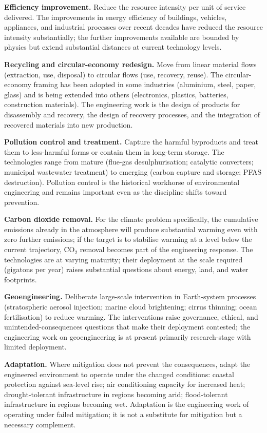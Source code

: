 \textbf{Efficiency improvement.} Reduce the resource intensity per unit of service delivered. The improvements in energy efficiency of buildings, vehicles, appliances, and industrial processes over recent decades have reduced the resource intensity substantially; the further improvements available are bounded by physics but extend substantial distances at current technology levels.

\textbf{Recycling and circular-economy redesign.} Move from linear material flows (extraction, use, disposal) to circular flows (use, recovery, reuse). The circular-economy framing has been adopted in some industries (aluminium, steel, paper, glass) and is being extended into others (electronics, plastics, batteries, construction materials). The engineering work is the design of products for disassembly and recovery, the design of recovery processes, and the integration of recovered materials into new production.

\textbf{Pollution control and treatment.} Capture the harmful byproducts and treat them to less-harmful forms or contain them in long-term storage. The technologies range from mature (flue-gas desulphurisation; catalytic converters; municipal wastewater treatment) to emerging (carbon capture and storage; PFAS destruction). Pollution control is the historical workhorse of environmental engineering and remains important even as the discipline shifts toward prevention.

\textbf{Carbon dioxide removal.} For the climate problem specifically, the cumulative emissions already in the atmosphere will produce substantial warming even with zero further emissions; if the target is to stabilise warming at a level below the current trajectory, CO$_2$ removal becomes part of the engineering response. The technologies are at varying maturity; their deployment at the scale required (gigatons per year) raises substantial questions about energy, land, and water footprints.

\textbf{Geoengineering.} Deliberate large-scale intervention in Earth-system processes (stratospheric aerosol injection; marine cloud brightening; cirrus thinning; ocean fertilisation) to reduce warming. The interventions raise governance, ethical, and unintended-consequences questions that make their deployment contested; the engineering work on geoengineering is at present primarily research-stage with limited deployment.

\textbf{Adaptation.} Where mitigation does not prevent the consequences, adapt the engineered environment to operate under the changed conditions: coastal protection against sea-level rise; air conditioning capacity for increased heat; drought-tolerant infrastructure in regions becoming arid; flood-tolerant infrastructure in regions becoming wet. Adaptation is the engineering work of operating under failed mitigation; it is not a substitute for mitigation but a necessary complement.

